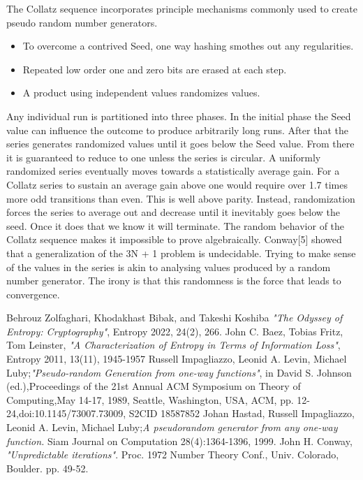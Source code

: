 \documentclass[letterpaper]{article}
\begin{document}
\begin{multicols}{2}
    The Collatz sequence incorporates principle mechanisms commonly used to create pseudo random number generators.

    \begin{itemize}
        \item To overcome a contrived Seed, one way hashing smothes out any regularities.
        \item Repeated low order one and zero bits are erased at each step.
        \item A product using independent values randomizes values.
    \end{itemize}
    Any individual run is partitioned into three phases. In the initial phase the Seed value can influence the outcome to produce arbitrarily long runs. After that the series generates randomized values until it goes below the Seed value. From there it is guaranteed to reduce to one unless the series is circular.
    A uniformly randomized series eventually moves towards a statistically average gain. For a Collatz series to sustain an average gain above one would require over 1.7 times more odd transitions than even. This is well above parity. Instead, randomization forces the series to average out and decrease until it inevitably goes below the seed. Once it does that we know it will terminate.
    The random behavior of the Collatz sequence makes it impossible to prove algebraically. Conway[5] showed that a generalization of the 3N + 1 problem is undecidable. Trying to make sense of the values in the series is akin to analysing values produced by a random number generator. The irony is that this randomness is the force that leads to convergence.

    \begin{thebibliography}{9}
        Behrouz Zolfaghari, Khodakhast Bibak, and Takeshi Koshiba \emph{"The Odyssey of Entropy: Cryptography"}, Entropy 2022, 24(2), 266.%
        John C. Baez, Tobias Fritz, Tom Leinster, \emph{"A Characterization of Entropy in Terms of Information Loss"}, Entropy 2011, 13(11), 1945-1957%
        Russell Impagliazzo, Leonid A. Levin, Michael Luby;\emph{"Pseudo-random Generation from one-way functions"}, in David S. Johnson (ed.),Proceedings of the 21st Annual ACM Symposium on Theory of Computing,May 14-17, 1989, Seattle, Washington, USA, {ACM}, pp. 12-24,doi:10.1145/73007.73009, S2CID 18587852%
        Johan Hastad, Russell Impagliazzo, Leonid A. Levin, Michael Luby;\emph{A pseudorandom generator from any one-way function.} Siam Journal on Computation 28(4):1364-1396, 1999.%
        John H. Conway, \emph{"Unpredictable iterations"}. Proc. 1972 Number Theory Conf., Univ. Colorado, Boulder. pp. 49-52.
    \end{thebibliography}


\end{multicols}
\end{document}
